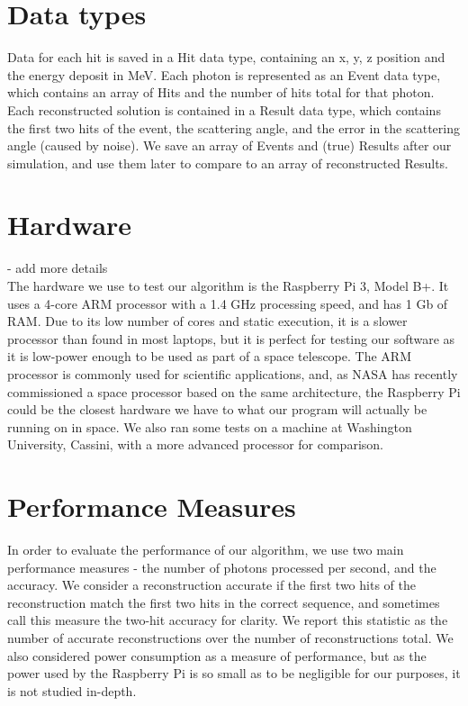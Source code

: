 \section{Data types}
Data for each hit is saved in a Hit data type, containing an x, y, z position and the energy deposit in MeV. Each photon is represented as an Event data type, which contains an array of Hits and the number of hits total for that photon. Each reconstructed solution is contained in a Result data type, which contains the first two hits of the event, the scattering angle, and the error in the scattering angle (caused by noise). We save an array of Events and (true) Results after our simulation, and use them later to compare to an array of reconstructed Results.

\section{Hardware} - add more details\\
The hardware we use to test our algorithm is the Raspberry Pi 3, Model B+. It uses a 4-core ARM processor with a 1.4 GHz processing speed, and has 1 Gb of RAM. Due to its low number of cores and static execution, it is a slower processor than found in most laptops, but it is perfect for testing our software as it is low-power enough to be used as part of a space telescope. The ARM processor is commonly used for scientific applications, and, as NASA has recently commissioned a space processor based on the same architecture, the Raspberry Pi could be the closest hardware we have to what our program will actually be running on in space. We also ran some tests on a machine at Washington University, Cassini, with a more advanced processor for comparison.

\section{Performance Measures}
In order to evaluate the performance of our algorithm, we use two main performance measures - the number of photons processed per second, and the accuracy. We consider a reconstruction accurate if the first two hits of the reconstruction match the first two hits in the correct sequence, and sometimes call this measure the two-hit accuracy for clarity. We report this statistic as the number of accurate reconstructions over the number of reconstructions total. We also considered power consumption as a measure of performance, but as the power used by the Raspberry Pi is so small as to be negligible for our purposes, it is not studied in-depth.

